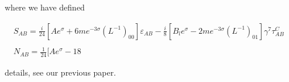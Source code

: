 \documentclass{article}
\begin{document}
where we have defined


\begin{equation}
\begin{array} { c } { S _ { A B } = \frac { i } { 2 4 } [ A e ^ { \sigma } + 6 m e ^ { - 3 \sigma } ( L ^ { - 1 } ) _ { 0 0 } ] \varepsilon _ { A B } - \frac { i } { 8 } [ B _ { l } e ^ { \sigma } - 2 m e ^ { - 3 \sigma } ( L ^ { - 1 } ) _ { 0 1 } ] \gamma ^ { 7 } \tau _ { A B } ^ { C } } \\ { } & { } \\ { N _ { A B } = \frac { 1 } { 2 4 } [ A e ^ { \sigma } - 1 8}\end{array}
\end{equation}


details, see our previous paper.
\end{document}
